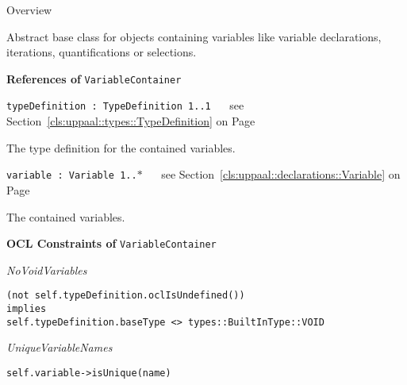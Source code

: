 	\begin{longdescription}
		\item[Overview] 		
				

	

		Abstract base class for objects containing variables like variable declarations, iterations, quantifications or selections.		
		
	
			\item[\textbf{References of} \texttt{VariableContainer}] ~
			\begin{longdescription}
	\item[\texttt{typeDefinition : TypeDefinition 	\symbol{"5B}1..1\symbol{"5D}
}] ~
	see Section~\ref{cls:uppaal::types::TypeDefinition} on Page~\pageref{cls:uppaal::types::TypeDefinition}
	
	\nopagebreak
		
				

	

		The type definition for the contained variables.		
	\item[\texttt{variable : Variable 	\symbol{"5B}1..$*$\symbol{"5D}
}] ~
	see Section~\ref{cls:uppaal::declarations::Variable} on Page~\pageref{cls:uppaal::declarations::Variable}
	
	\nopagebreak
		
				

	

		The contained variables.		
			\end{longdescription}
			\item[\textbf{OCL Constraints of} \texttt{VariableContainer}] ~
			\begin{longdescription}
	\item[\small\textit{NoVoidVariables}] ~ 
	\nopagebreak
	
		\begin{lstlisting}[breaklines=true]
(not self.typeDefinition.oclIsUndefined())
implies
self.typeDefinition.baseType <> types::BuiltInType::VOID		\end{lstlisting}
	\item[\small\textit{UniqueVariableNames}] ~ 
	\nopagebreak
	
		\begin{lstlisting}[breaklines=true]
self.variable->isUnique(name)		\end{lstlisting}
			\end{longdescription}
	
	\end{longdescription}
	

